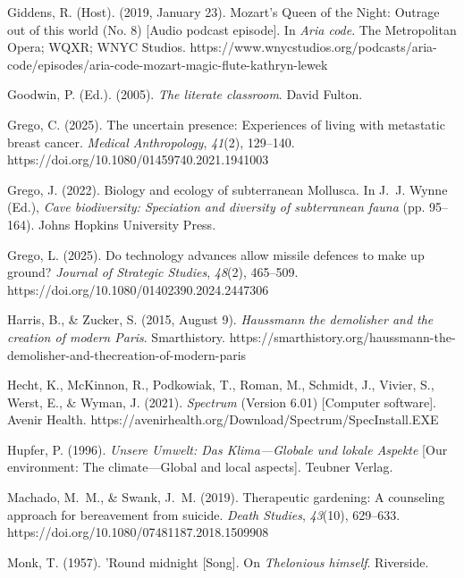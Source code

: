 \documentclass[]{interact}
\theoremstyle{plain}%
\theoremstyle{definition}
\theoremstyle{remark}
\begin{document}
\begin{thebibliography}{}
Giddens, R. (Host). (2019, January 23). Mozart’s Queen of the Night: Outrage out of this
world (No. 8) [Audio podcast episode]. In \emph{Aria code}. The Metropolitan Opera; WQXR;
WNYC Studios. https://www.wnycstudios.org/podcasts/aria-code/episodes/aria-code-mozart-magic-flute-kathryn-lewek

Goodwin, P. (Ed.). (2005). \emph{The literate classroom}. David Fulton.

Grego, C. (2025). The uncertain presence: Experiences of living with metastatic breast cancer.
\emph{Medical Anthropology}, \emph{41}(2), 129–140. https://doi.org/10.1080/01459740.2021.1941003

Grego, J. (2022). Biology and ecology of subterranean Mollusca. In J.~J. Wynne (Ed.), \emph{Cave
biodiversity: Speciation and diversity of subterranean fauna} (pp. 95--164). Johns Hopkins
University Press.

Grego, L. (2025). Do technology advances allow missile defences to make up ground? \emph{Journal
of Strategic Studies}, \emph{48}(2), 465–509. https://doi.org/10.1080/01402390.2024.2447306

Harris, B., \& Zucker, S. (2015, August 9). \emph{Haussmann the demolisher and the creation of
modern Paris}. Smarthistory. https://smarthistory.org/haussmann-the-demolisher-and-thecreation-of-modern-paris

Hecht, K., McKinnon, R., Podkowiak, T., Roman, M., Schmidt, J., Vivier, S., Werst, E.,
\& Wyman, J. (2021). \emph{Spectrum} (Version 6.01) [Computer software]. Avenir Health.
https://avenirhealth.org/Download/Spectrum/SpecInstall.EXE

Hupfer, P. (1996). \emph{Unsere Umwelt: Das Klima—Globale und lokale Aspekte} [Our environment: The climate—Global and local aspects]. Teubner Verlag.

Machado, M.~M., \& Swank, J.~M. (2019). Therapeutic gardening: A counseling
approach for bereavement from suicide. \emph{Death Studies}, \emph{43}(10), 629--633.
https://doi.org/10.1080/07481187.2018.1509908

Monk, T. (1957). 'Round midnight [Song]. On \emph{Thelonious himself}. Riverside.


\end{thebibliography}
\end{document}
